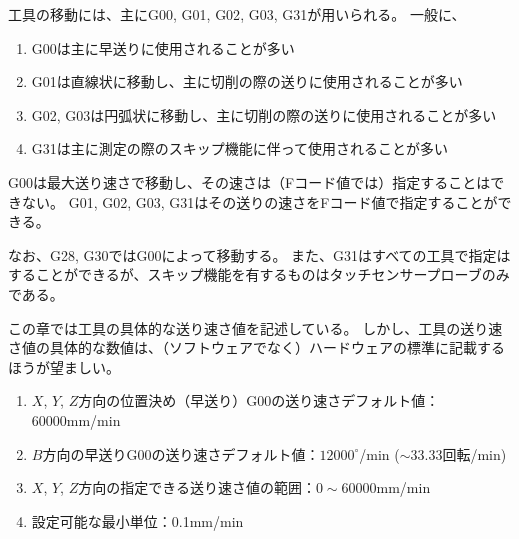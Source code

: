 


工具の移動には、主に{\ttfamily G00}, {\ttfamily G01}, {\ttfamily G02}, {\ttfamily G03}, {\ttfamily G31}が用いられる。
一般に、
\begin{enumerate}
\item {\ttfamily G00}は主に早送りに使用されることが多い
\item {\ttfamily G01}は直線状に移動し、主に切削の際の送りに使用されることが多い
\item {\ttfamily G02}, {\ttfamily G03}は円弧状に移動し、主に切削の際の送りに使用されることが多い
\item {\ttfamily G31}は主に測定の際のスキップ機能に伴って使用されることが多い
\end{enumerate}
{\ttfamily G00}は最大送り速さで移動し、その速さは（Fコード値では）指定することはできない。
{\ttfamily G01}, {\ttfamily G02}, {\ttfamily G03}, {\ttfamily G31}はその送りの速さをFコード値で指定することができる。

なお、{\ttfamily G28}, {\ttfamily G30}では{\ttfamily G00}によって移動する。
また、{\ttfamily G31}はすべての工具で指定はすることができるが、スキップ機能を有するものはタッチセンサープローブのみである。
\begin{marker}
この章では工具の具体的な送り速さ値を記述している。
しかし、工具の送り速さ値の具体的な数値は、（ソフトウェアでなく）ハードウェアの標準に記載するほうが望ましい。
\end{marker}



\begin{enumerate}
\item $X$, $Y$, $Z$方向の位置決め（早送り）{\ttfamily G00}の送り速さデフォルト値：60000mm/min
\item $B$方向の早送り{\ttfamily G00}の送り速さデフォルト値：$12000^\circ$/min ($\sim 33.33$回転/min)
\item $X$, $Y$, $Z$方向の指定できる送り速さ値の範囲：$0\sim60000$mm/min
\item 設定可能な最小単位：0.1mm/min
\end{enumerate}



